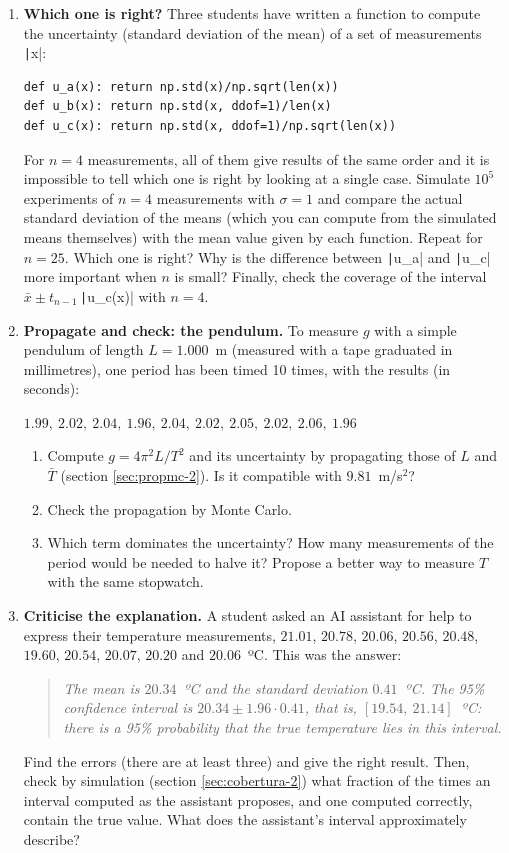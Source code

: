 \begin{enumerate}
\item \label{ej:cual_incertidumbre-en} \textbf{Which one is right?} Three students have written a function to compute the uncertainty (standard deviation of the mean) of a set of measurements \texttt|x|:
\begin{verbatim}
def u_a(x): return np.std(x)/np.sqrt(len(x))
def u_b(x): return np.std(x, ddof=1)/len(x)
def u_c(x): return np.std(x, ddof=1)/np.sqrt(len(x))
\end{verbatim}
For $n=4$ measurements, all of them give results of the same order and it is impossible to tell which one is right by looking at a single case. Simulate $10^5$ experiments of $n=4$ measurements with $\sigma=1$ and compare the actual standard deviation of the means (which you can compute from the simulated means themselves) with the mean value given by each function. Repeat for $n=25$. Which one is right? Why is the difference between \texttt|u_a| and \texttt|u_c| more important when $n$ is small? Finally, check the coverage of the interval $\bar{x}\pm t_{n-1}\,$\texttt|u_c(x)| with $n=4$.

\item \label{ej:pendulo_prop-en} \textbf{Propagate and check: the pendulum.} To measure $g$ with a simple pendulum of length $L=1.000$~m (measured with a tape graduated in millimetres), one period has been timed 10 times, with the results (in seconds):
\begin{center}
$1.99,\ 2.02,\ 2.04,\ 1.96,\ 2.04,\ 2.02,\ 2.05,\ 2.02,\ 2.06,\ 1.96$
\end{center}
\begin{enumerate}
\item Compute $g=4\pi^2L/T^2$ and its uncertainty by propagating those of $L$ and $\bar{T}$ (section \ref{sec:propmc-2}). Is it compatible with $9.81$~m/s$^2$?
\item Check the propagation by Monte Carlo.
\item Which term dominates the uncertainty? How many measurements of the period would be needed to halve it? Propose a better way to measure $T$ with the same stopwatch.
\end{enumerate}

\item \label{ej:ia_intervalo-en} \textbf{Criticise the explanation.} A student asked an AI assistant for help to express their temperature measurements, $21.01$, $20.78$, $20.06$, $20.56$, $20.48$, $19.60$, $20.54$, $20.07$, $20.20$ and $20.06$~ºC. This was the answer:
\begin{quote}
\emph{The mean is $20.34$~ºC and the standard deviation $0.41$~ºC. The 95\% confidence interval is $20.34\pm1.96\cdot0.41$, that is, $[19.54,\ 21.14]$~ºC: there is a 95\% probability that the true temperature lies in this interval.}
\end{quote}
Find the errors (there are at least three) and give the right result. Then, check by simulation (section \ref{sec:cobertura-2}) what fraction of the times an interval computed as the assistant proposes, and one computed correctly, contain the true value. What does the assistant's interval approximately describe?


\end{enumerate}
